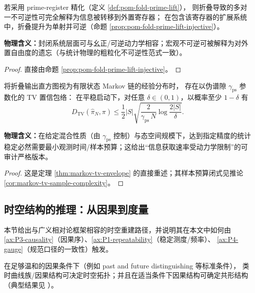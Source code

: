 \begin{physicalaxiom}\label{ax:P6-reversible-by-lift}
若采用 prime-register 精化（定义 \ref{def:pom-fold-prime-lift}），
则折叠导致的多对一不可逆性可完全解释为信息被转移到外置寄存器；
在包含该寄存器的扩展系统中，折叠提升为单射并可逆（命题 \ref{prop:pom-fold-prime-lift-injective}）。

\medskip\noindent\textbf{物理含义：}封闭系统层面可与幺正/可逆动力学相容；宏观不可逆可被解释为对外置自由度的遗忘（与统计物理的粗粒化不可逆性范式一致）。
\end{physicalaxiom}
\begin{proof}
直接由命题 \ref{prop:pom-fold-prime-lift-injective}。
\end{proof}

\begin{physicalaxiom}\label{ax:P7-sample-time}
将折叠输出直方图视为有限状态 Markov 链的经验分布时，
存在以伪谱隙 \(\gamma_{\mathrm{ps}}\) 参数化的 TV 置信包络：
在平稳启动下，对任意 \(\delta\in(0,1)\)，以概率至少 \(1-\delta\) 有
\[
D_{\mathrm{TV}}(\hat{\pi}_N,\pi)\le \frac12|S|\sqrt{\frac{2}{\gamma_{\mathrm{ps}}\,N}\log\frac{2|S|}{\delta}}.
\]

\medskip\noindent\textbf{物理含义：}在给定混合性质（由 \(\gamma_{\mathrm{ps}}\) 控制）与态空间规模下，达到指定精度的统计稳定必然需要最小观测时间/样本预算；这给出“信息获取速率受动力学限制”的可审计严格版本。
\end{physicalaxiom}
\begin{proof}
这是定理 \ref{thm:markov-tv-envelope} 的直接重述；其样本预算闭式见推论 \ref{cor:markov-tv-sample-complexity}。
\end{proof}

\subsection{时空结构的推理：从因果到度量}
\label{subsec:appH2-spacetime}

本节给出与广义相对论框架相容的时空重建路径，并说明其在本文中如何由
\ref{ax:P3-causality}（因果序）、\ref{ax:P1-repeatability}（稳定测度/频率）、
\ref{ax:P4-gauge}（规范口径的一致性）触发。

\begin{hproposition}\label{prop:appH2-causal-determines-topology}
在足够温和的因果条件下（例如 past and future distinguishing 等标准条件），
类时曲线族/因果结构可决定时空拓扑；并且在适当条件下因果结构可确定共形结构
（典型结果见 \cite{Malament1977TimelikeCurvesTopology,HawkingKingMcCarthy1976PathTopology}）。
\end{hproposition}

